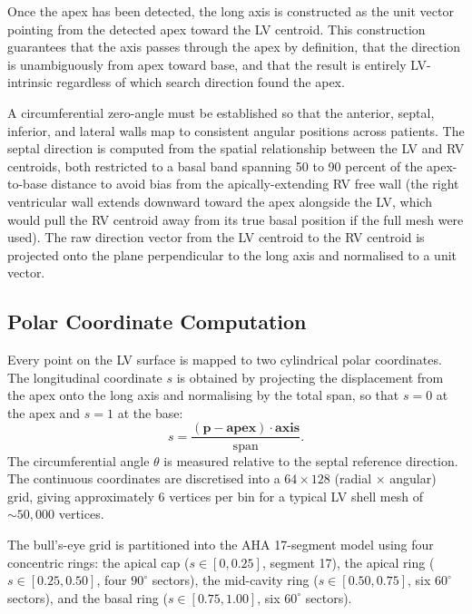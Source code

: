 Once the apex has been detected, the long axis is constructed as the unit vector pointing
from the detected apex toward the LV centroid. This construction guarantees that the axis
passes through the apex by definition, that the direction is unambiguously from apex toward
base, and that the result is entirely LV-intrinsic regardless of which search direction found the
apex.

A circumferential zero-angle must be established so that the anterior, septal, inferior, and
lateral walls map to consistent angular positions across patients. The septal direction is
computed from the spatial relationship between the LV and RV centroids, both restricted to a
basal band spanning 50 to 90 percent of the apex-to-base distance to avoid bias from the
apically-extending RV free wall (the right ventricular wall extends downward toward the apex
alongside the LV, which would pull the RV centroid away from its true basal position if the
full mesh were used). The raw direction vector from the LV centroid to the RV
centroid is projected onto the plane perpendicular to the long axis and normalised to a unit
vector.

\subsection{Polar Coordinate Computation}

Every point on the LV surface is mapped to two cylindrical polar coordinates. The
longitudinal coordinate $s$ is obtained by projecting the displacement from the apex onto the
long axis and normalising by the total span, so that $s = 0$ at the apex and $s = 1$ at the base:
\begin{equation}
    s = \frac{(\mathbf{p} - \mathbf{apex}) \cdot \mathbf{axis}}{\text{span}}.
    \label{eq:longcoord}
\end{equation}
The circumferential angle $\theta$ is measured relative to the septal reference direction. The
continuous coordinates are discretised into a $64 \times 128$ (radial $\times$ angular) grid,
giving approximately 6 vertices per bin for a typical LV shell mesh of ${\sim}50{,}000$ vertices.

The bull's-eye grid is partitioned into the AHA 17-segment model \cite{cerqueira2002} using four concentric rings:
the apical cap ($s \in [0, 0.25]$, segment 17), the apical ring ($s \in [0.25, 0.50]$, four
$90^{\circ}$ sectors), the mid-cavity ring ($s \in [0.50, 0.75]$, six $60^{\circ}$ sectors), and
the basal ring ($s \in [0.75, 1.00]$, six $60^{\circ}$ sectors).


